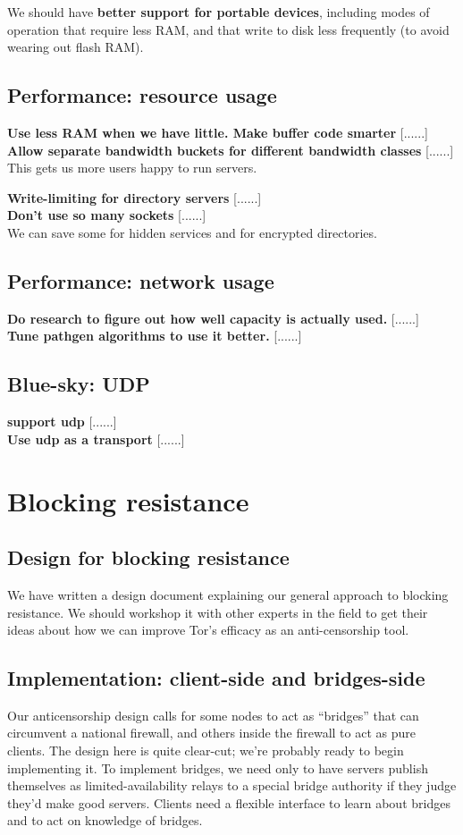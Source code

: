 \documentclass{article}
\newcommand{\tmp}[1]{{\bf #1} [......] \\}
\begin{document}
We should have {\bf better support for portable devices}, including modes of
operation that require less RAM, and that write to disk less frequently (to
avoid wearing out flash RAM).

\subsection{Performance: resource usage}

\tmp{Use less RAM when we have little.  Make buffer code smarter}

\tmp{Allow separate bandwidth buckets for different bandwidth classes}  This
gets us more users happy to run servers.

\tmp{Write-limiting for directory servers}

\tmp{Don't use so many sockets} We can save some for hidden services and for
  encrypted directories.

\subsection{Performance: network usage}

\tmp{Do research to figure out how well capacity is actually used.}

\tmp{Tune pathgen algorithms to use it better.}


\subsection{Blue-sky: UDP}

\tmp{support udp}

\tmp{Use udp as a transport}




\section{Blocking resistance}

\subsection{Design for blocking resistance}
We have written a design document explaining our general approach to blocking
resistance.  We should workshop it with other experts in the field to get
their ideas about how we can improve Tor's efficacy as an anti-censorship
tool.


\subsection{Implementation: client-side and bridges-side}
Our anticensorship design calls for some nodes to act as ``bridges'' that can
circumvent a national firewall, and others inside the firewall to act as pure
clients.  The design here is quite clear-cut; we're probably ready to begin
implementing it.  To implement bridges, we need only to have servers publish
themselves as limited-availability relays to a special bridge authority if
they judge they'd make good servers.  Clients need a flexible interface to
learn about bridges and to act on knowledge of bridges.
\end{document}
